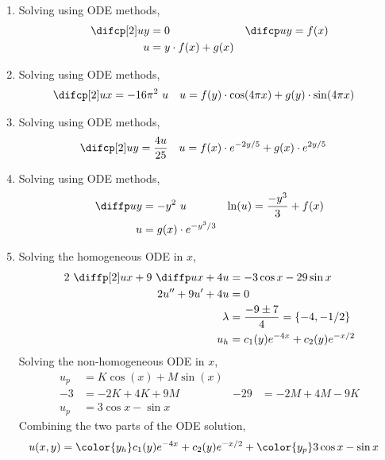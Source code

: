 \begin{enumerate}
    \item Solving using ODE methods,
          \begin{align}
              \difcp[2] uy & = 0                   &
              \difcp uy    & = f(x)                  \\
              u            & = y \cdot f(x) + g(x)
          \end{align}

    \item Solving using ODE methods,
          \begin{align}
              \difcp[2] ux & = -16\pi^2\ u                                       &
              u            & = f(y) \cdot \cos(4\pi x) + g(y) \cdot \sin(4\pi x)
          \end{align}

    \item Solving using ODE methods,
          \begin{align}
              \difcp[2] uy & = \frac{4u}{25}                              &
              u            & = f(x) \cdot e^{-2y/5} + g(x) \cdot e^{2y/5}
          \end{align}

    \item Solving using ODE methods,
          \begin{align}
              \diffp uy & = -y^2\ u               &
              \ln(u)    & = \frac{-y^3}{3} + f(x)   \\
              u         & = g(x) \cdot e^{-y^3/3}
          \end{align}

    \item Solving the homogeneous ODE in $ x $,
          \begin{align}
              2\ \diffp[2] ux + 9\ \diffp ux + 4u & = -3 \cos x - 29 \sin x            \\
              2 u'' + 9u' + 4u                    & = 0                                \\
              \lambda                             & = \frac{-9 \pm 7}{4}
              = \{-4, -1/2\}                                                           \\
              u_h                                 & = c_1(y) e^{-4x} + c_2(y) e^{-x/2}
          \end{align}
          Solving the non-homogeneous ODE in $x$,
          \begin{align}
              u_p & = K \cos(x) + M \sin(x)   \\
              -3  & = -2K + 4K + 9M         &
              -29 & = -2M + 4M - 9K           \\
              u_p & = 3\cos x - \sin x
          \end{align}
          Combining the two parts of the ODE solution,
          \begin{align}
              u(x, y) & = {\color{y_h} c_1(y) e^{-4x} + c_2(y) e^{-x/2}}
              + {\color{y_p} 3\cos x - \sin x}
          \end{align}


\end{enumerate}
